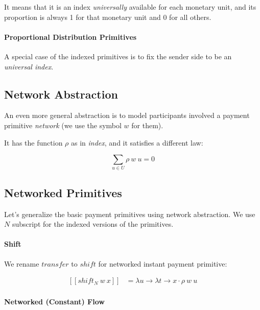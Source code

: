 It means that it is an index \textit{universally} available for each monetary unit, and its
proportion is always 1 for that monetary unit and 0 for all others.

\paragraph{Proportional Distribution Primitives}

A special case of the indexed primitives is to fix the sender side to be an \textit{universal
index}.

\subsection{Network Abstraction}

An even more general abstraction is to model participants involved a payment
primitive \textit{network} (we use the symbol $w$ for them).

It has the function $\rho$ as in \textit{index}, and it satisfies a different law:

\begin{equation}
    \displaystyle \sum_{u \in U} \rho\ w\ u = 0
\end{equation}

\subsection{Networked Primitives}

Let's generalize the basic payment primitives using network abstraction. We use $N$ subscript for
the indexed versions of the primitives.

\paragraph{Shift}

We rename $transfer$ to $shift$ for networked instant payment primitive:

\begin{equation}
    \begin{split}
        [\![shift_N\ w\ x]\!] &=
        \lambda u \rightarrow \lambda t \rightarrow x \cdot \rho\ w\ u
    \end{split}
\end{equation}

\paragraph{Networked (Constant) Flow}

